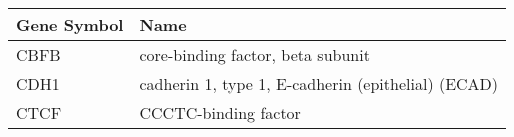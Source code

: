 \begin{tabular}{ll}
\toprule
Gene Symbol &                                               Name \\
\midrule
       CBFB &                  core-binding factor, beta subunit \\
       CDH1 & cadherin 1, type 1, E-cadherin (epithelial) (ECAD) \\
       CTCF &                               CCCTC-binding factor \\
\bottomrule
\end{tabular}
